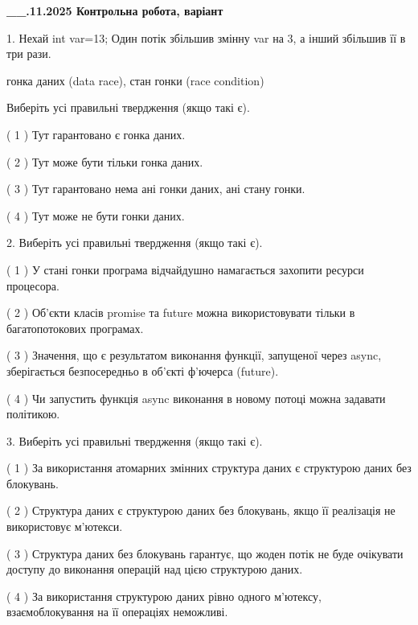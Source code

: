 \documentclass[12pt, ukrainian]{article}
\begin{document}
\newpage
\begin {large}

\textbf{\_\_.11.2025 Контрольна робота, варіант  }\par


{
1. Нехай int var=13; Один потік збільшив змінну var на 3, а інший збільшив її в три рази.

гонка даних (data race), стан гонки (race condition)

Виберіть усі правильні твердження (якщо такі є).\par
\vspace{2mm}
( 1 ) Тут гарантовано є гонка даних.%

( 2 ) Тут може бути тільки гонка даних.%

( 3 ) Тут гарантовано нема ані гонки даних, ані стану гонки.%

( 4 ) Тут може не бути гонки даних.%


2. Виберіть усі правильні твердження (якщо такі є).\par
\vspace{2mm}

( 1 ) У стані гонки програма відчайдушно намагається захопити ресурси процесора.%

( 2 ) Об’єкти класів promise та future можна використовувати тільки в багатопотокових програмах.%

( 3 ) Значення, що є результатом виконання функції, запущеної через async, зберігається безпосередньо в об’єкті ф’ючерса (future).%

( 4 ) Чи запустить функція  async виконання в новому потоці можна задавати політикою.%


3. Виберіть усі правильні твердження (якщо такі є).\par
\vspace{2mm}

( 1 ) За використання атомарних змінних структура даних є структурою даних без блокувань.%

( 2 ) Структура даних є структурою даних без блокувань, якщо її реалізація не використовує м’ютекси.%

( 3 ) Структура даних без блокувань гарантує, що жоден потік не буде очікувати доступу до виконання операцій над цією структурою даних.%

( 4 ) За використання структурою даних рівно одного м’ютексу, взаємоблокування на її операціях неможливі.%


}
\end{large}
\end{document}
